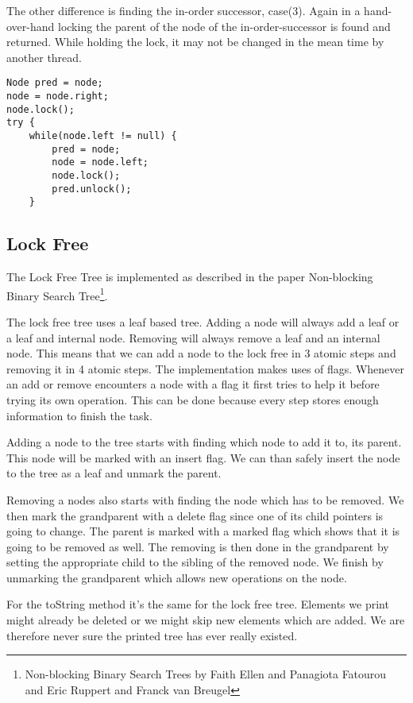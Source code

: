 \documentclass[10pt,a4paper]{article}
\begin{document}
The other difference is finding the in-order successor, case(3). Again in a hand-over-hand locking the parent of the node of the in-order-successor is found and returned. While holding the lock, it may not be changed in the mean time by another thread.

\begin{lstlisting}
Node pred = node;
node = node.right;
node.lock();
try {
    while(node.left != null) {
        pred = node;
        node = node.left;
        node.lock();
        pred.unlock();
    }
\end{lstlisting}

\subsection{Lock Free}
The Lock Free Tree is implemented as described in the paper Non-blocking Binary Search Tree\footnote{Non-blocking Binary Search Trees by Faith Ellen and Panagiota Fatourou and Eric Ruppert and Franck van Breugel}. 

The lock free tree uses a leaf based tree. Adding a node will always add a leaf or a leaf and internal node. Removing will always remove a leaf and an internal node. This means that we can add a node to the lock free in 3 atomic steps and removing it in 4 atomic steps. The implementation makes uses of flags. Whenever an add or remove encounters a node with a flag it first tries to help it before trying its own operation. This can be done because every step stores enough information to finish the task.

Adding a node to the tree starts with finding which node to add it to, its parent. This node will be marked with an insert flag. We can than safely insert the node to the tree as a leaf and unmark the parent. 

Removing a nodes also starts with finding the node which has to be removed. We then mark the grandparent with a delete flag since one of its child pointers is going to change. The parent is marked with a marked flag which shows that it is going to be removed as well. The removing is then done in the grandparent by setting the appropriate child to the sibling of the removed node. We finish by unmarking the grandparent which allows new operations on the node.

For the toString method it's the same for the lock free tree. Elements we print might already be deleted or we might skip new elements which are added. We are therefore never sure the printed tree has ever really existed.
\end{document}
